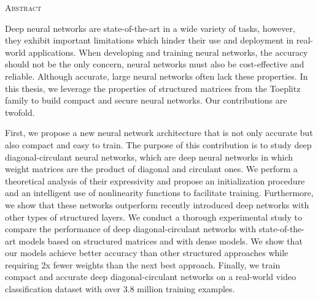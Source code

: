 \newpage
\begin{center}
  {\Huge \textsc{Abstract}}
\end{center}
%
\noindent
Deep neural networks are state-of-the-art in a wide variety of tasks, however, they exhibit important limitations which hinder their use and deployment in real-world applications.
When developing and training neural networks, the accuracy should not be the only concern, neural networks must also be cost-effective and reliable.
Although accurate, large neural networks often lack these properties.
In this thesis, we leverage the properties of structured matrices from the Toeplitz family to build compact and secure neural networks.
Our contributions are twofold.


First, we propose a new neural network architecture that is not only accurate but also compact and easy to train.
The purpose of this contribution is to study deep diagonal-circulant neural networks, which are deep neural networks in which weight matrices are the product of diagonal and circulant ones.
We perform a theoretical analysis of their expressivity and propose an initialization procedure and an intelligent use of nonlinearity functions to facilitate training. 
Furthermore, we show that these networks outperform recently introduced deep networks with other types of structured layers.
We conduct a thorough experimental study to compare the performance of deep diagonal-circulant networks with state-of-the-art models based on structured matrices and with dense models.
We show that our models achieve better accuracy than other structured approaches while requiring 2x fewer weights than the next best approach.
Finally, we train compact and accurate deep diagonal-circulant networks on a real-world video classification dataset with over 3.8 million training examples.

